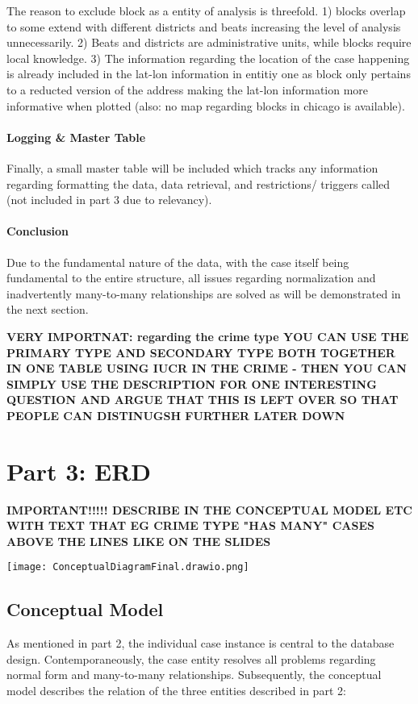 \documentclass[a4paper]{article}
\begin{document}
The reason to exclude block as a entity of analysis is threefold. 1) blocks overlap to some extend with different districts and beats increasing the level of analysis unnecessarily. 2) Beats and districts are administrative units, while blocks require local knowledge. 3) The information regarding the location of the case happening is already included in the lat-lon information in entitiy one as block only pertains to a reducted version of the address making the lat-lon information more informative when plotted (also: no map regarding blocks in chicago is available). 

\paragraph{Logging \& Master Table} Finally, a small master table will be included which tracks any information regarding formatting the data, data retrieval, and restrictions/ triggers called (not included in part 3 due to relevancy).


\paragraph{Conclusion} Due to the fundamental nature of the data, with the case itself being fundamental to the entire structure, all issues regarding normalization and inadvertently many-to-many relationships are solved as will be demonstrated in the next section.


\textbf{VERY IMPORTNAT: regarding the crime type YOU CAN USE THE PRIMARY TYPE AND SECONDARY TYPE BOTH TOGETHER IN ONE TABLE USING IUCR IN THE CRIME - THEN YOU CAN SIMPLY USE THE DESCRIPTION FOR ONE INTERESTING QUESTION AND ARGUE THAT THIS IS LEFT OVER SO THAT PEOPLE CAN DISTINUGSH FURTHER LATER DOWN}

\section{Part 3: ERD}

\textbf{IMPORTANT!!!!! DESCRIBE IN THE CONCEPTUAL MODEL ETC WITH TEXT THAT EG CRIME TYPE "HAS MANY" CASES ABOVE THE LINES LIKE ON THE SLIDES}

\texttt{[image: ConceptualDiagramFinal.drawio.png]}

\subsection{Conceptual Model}
As mentioned in part 2, the individual case instance is central to the database design. Contemporaneously, the case entity resolves all problems regarding normal form and many-to-many relationships. Subsequently, the conceptual model describes the relation of the three entities described in part 2: 
\end{document}
